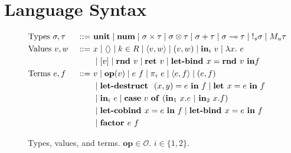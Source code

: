 \section{Language Syntax}

\begin{figure}[tbp]
  \begin{alignat*}{3}
         &\text{Types } \sigma, \tau &::=~ &\mathbf{unit}
         \mid \num
         \mid \sigma \times \tau 
         \mid \sigma \otimes \tau
         \mid \sigma + \tau 
         \mid \sigma \multimap \tau
         \mid {\bang{s} \sigma}
         \mid {M_u \tau}
         \\
         &\text{Values } v, w \ &::=~ &x
         \mid \langle \rangle
         \mid k \in R
         \mid \langle v,w \rangle 
         \mid (v, w)
         \mid \tin_i \ v
         \mid \lambda x.~e \\
         & & & \mid [v]
         \mid\rnd v
         \mid {\ret v} 
         \mid \letbind x = \rnd v \ \tin f 
         \\
         &\text{Terms } e, f &::=~ & v
         \mid \mathbf{op}(v)
         \mid e~f
         \mid {\pi}_i\ e
         \mid \langle e,f \rangle 
         \mid (e, f) \\
         & & & \mid \letdestruct \ (x,y) = e \ \tin \ f
         \mid \letassign x  = e \ \tin \ f \\
         & & & \mid \tin_i \ e
         \mid 
          \mathbf{case} \ v \ \mathbf{of} \ (\tin_1 \ x.e \ | \ \tin_2 \ x.f) \\
         & & & 
         \mid \letcobind x = e \ \tin \ f
         \mid {\letbind x = e \ \tin \ f} \\
         & & &
         \mid \factor e \ f
  \end{alignat*}
  \caption{
    Types, values, and terms. 
    $\mathbf{op} \in \mathcal{O}$.
    $i \in \{1, 2\}$. 
  }
  \label{fig:syntax}
\end{figure}


